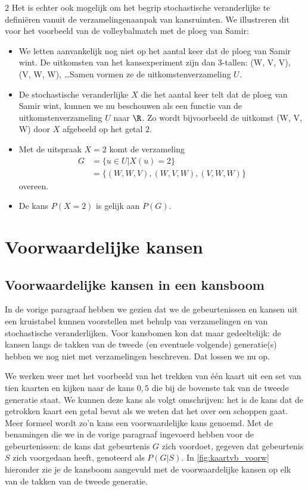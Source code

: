 \begin{multicols} {2}
Het is echter ook mogelijk om het begrip stochastische veranderlijke te definiëren vanuit de verzamelingenaanpak van kansruimten. We illustreren dit voor het voorbeeld van de volleybalmatch met de ploeg van Samir:

\begin{itemize}
    \item We letten aanvankelijk nog niet op het aantal keer dat de ploeg van Samir wint. De uitkomsten van het kansexperiment zijn dan 3-tallen: (W, V, V), (V, W, W), \dots Samen vormen ze de uitkomstenverzameling $U$.
    \item De stochastische veranderlijke $X$ die het aantal keer telt dat de ploeg van Samir wint, kunnen we nu beschouwen als een functie van de uitkomstenverzameling $U$ naar $\R$. Zo wordt bijvoorbeeld de uitkomst (W, V, W) door $X$ afgebeeld op het getal $2$.
    \item Met de uitspraak $X=2$ komt de verzameling
    \begin{equation*}
    \begin{split}
     G & =\{u \in U | X(u)=2\} \\
     & =\{(W, W, V),(W, V, W),(V, W, W)\}    
    \end{split}
    \end{equation*}
 overeen.
    \item De kans $P(X=2)$ is gelijk aan $P(G)$.
\end{itemize}
 
\section{Voorwaardelijke kansen}

\subsection*{Voorwaardelijke kansen in een kansboom}

In de vorige paragraaf hebben we gezien dat we de gebeurtenissen en kansen uit een kruistabel kunnen voorstellen met behulp van verzamelingen en van stochastische veranderlijken. Voor kansbomen kon dat maar gedeeltelijk: de kansen langs de takken van de tweede (en eventuele volgende) generatie(s) hebben we nog niet met verzamelingen beschreven. Dat lossen we nu op.

We werken weer met het voorbeeld van het trekken van één kaart uit een set van tien kaarten en kijken naar de kans $0,5$ die bij de bovenste tak van de tweede generatie staat. We kunnen deze kans als volgt omschrijven: het is de kans dat de getrokken kaart een getal bevat als we weten dat het over een schoppen gaat. Meer formeel   wordt zo’n kans een voorwaardelijke kans genoemd. Met de benamingen die we in de vorige paragraaf ingevoerd hebben voor de gebeurtenissen: de kans dat gebeurtenis $G$ zich voordoet, gegeven dat gebeurtenis $S$ zich voorgedaan heeft, genoteerd als $P(G|S)$. In \autoref{fig:kaartvb_voorw} hieronder zie je de kansboom aangevuld met de voorwaardelijke kansen op elk van de takken van de tweede generatie.


\end{multicols}
